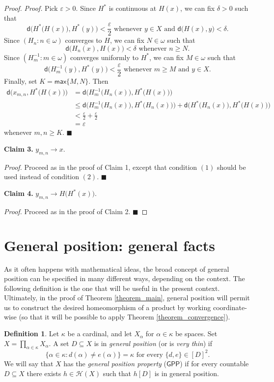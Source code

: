 \documentclass{amsart}
\theoremstyle{plain}
\theoremstyle{definition}
\newtheorem{definition}[theorem]{Definition}
\newcommand{\maxi}{\mathsf{max}}
\newcommand{\di}{\mathsf{d}}
\newcommand{\GPP}{\mathsf{GPP}}
\newcommand{\HH}{\mathcal{H}}
\begin{document}
\begin{proof}
\noindent\textit{Proof.} Pick $\varepsilon >0$. Since $H^\ast$ is continuous at $H(x)$, we can fix $\delta >0$ such that
$$
\di\Big(H^\ast\big(H(x)\big),H^\ast(y)\Big)<\frac{\varepsilon}{2}\text{ whenever }y\in X\text{ and }\di\big(H(x),y\big)<\delta.
$$
Since $(H_n:n\in\omega)$ converges to $H$, we can fix $N\in\omega$ such that
$$
\di\big(H_n(x),H(x)\big)<\delta\text{ whenever }n\geq N.
$$
Since $(H^{-1}_m:m\in\omega)$ converges uniformly to $H^\ast$, we can fix $M\in\omega$ such that
$$
\di\big(H^{-1}_m(y),H^\ast(y)\big)<\frac{\varepsilon}{2}\text{ whenever }m\geq M\text{ and }y\in X.
$$
Finally, set $K=\maxi\{M,N\}$. Then
\begin{align}
\di\Big(x_{m,n},H^\ast\big(H(x)\big)\Big)&=\di\Big(H_m^{-1}\big(H_n(x)\big),H^\ast\big(H(x)\big)\Big)\nonumber\\
&\leq\di\Big(H_m^{-1}\big(H_n(x)\big),H^\ast\big(H_n(x)\big)\Big)+\di\Big(H^\ast\big(H_n(x)\big),H^\ast\big(H(x)\big)\Big)\nonumber\\
&<\frac{\varepsilon}{2}+\frac{\varepsilon}{2}\nonumber\\
&=\varepsilon\nonumber
\end{align}
whenever $m,n\geq K$. $\blacksquare$

\noindent\textbf{Claim 3.} $y_{m,n}\to x$.

\noindent\textit{Proof.} Proceed as in the proof of Claim 1, except that condition $(1)$ should be used instead of condition $(2)$. $\blacksquare$

\noindent\textbf{Claim 4.} $y_{m,n}\to H\big(H^\ast(x)\big)$.

\noindent\textit{Proof.} Proceed as in the proof of Claim 2. $\blacksquare$
\end{proof}

\section{General position: general facts}\label{section_general}

As it often happens with mathematical ideas, the broad concept of general position can be specified in many different ways, depending on the context. The following definition is the one that will be useful in the present context. Ultimately, in the proof of Theorem \ref{theorem_main}, general position will permit us to construct the desired homeomorphism of a product by working coordinate-wise (so that it will be possible to apply Theorem \ref{theorem_convergence}).

\begin{definition}\label{definition_general_position}
Let $\kappa$ be a cardinal, and let $X_\alpha$ for $\alpha\in\kappa$ be spaces. Set $X=\prod_{\alpha\in\kappa}X_\alpha$. A set $D\subseteq X$ is in \emph{general position} (or is \emph{very thin}) if
$$
\{\alpha\in\kappa:d(\alpha)\neq e(\alpha)\}=\kappa\text{ for every }\{d,e\}\in [D]^2.
$$
We will say that $X$ has the \emph{general position property} ($\GPP$) if for every countable $D\subseteq X$ there exists $h\in\HH(X)$ such that $h[D]$ is in general position.
\end{definition}
\end{document}
